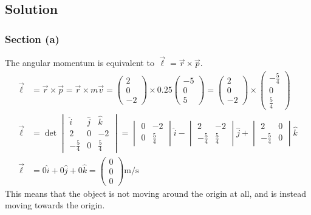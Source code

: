 \documentclass[12pt]{article}
\begin{document}
\subsection{Solution}
\subsubsection{Section (a)}
The angular momentum is equivalent to \(\vec{\ell} = \vec{r}\times\vec{p}\).
\begin{align}
    \vec{\ell}  &=  \vec{r} \times \vec{p}
        =   \vec{r} \times m\vec{v}
        =   \begin{pmatrix}2\\0\\-2\end{pmatrix} \times 0.25\begin{pmatrix}-5\\0\\5\end{pmatrix}
        =   \begin{pmatrix}2\\0\\-2\end{pmatrix} \times \begin{pmatrix}-\frac{5}{4}\\0\\\frac{5}{4}\end{pmatrix}\\
    \vec{\ell}  &=  \det\begin{vmatrix}
                            \hat{i} &\hat{j}&\hat{k}\\
                            2       &0      &-2     \\
                            -\frac{5}{4}&0  &\frac{5}{4}
                        \end{vmatrix}
        =   \begin{vmatrix}0&-2\\0&\frac{5}{4}\end{vmatrix}\hat{i} -
            \begin{vmatrix}2&-2\\-\frac{5}{4}&\frac{5}{4}\end{vmatrix}\hat{j} + 
            \begin{vmatrix}2&0\\-\frac{5}{4}&0\end{vmatrix}\hat{k}\\
    \vec{\ell}  &=  0\hat{i} + 0\hat{j} + 0\hat{k} 
        = \boxed{\begin{pmatrix}0\\0\\0\end{pmatrix}\unit{\meter/\second}}
\end{align}
This means that the object is not moving around the origin at all, and is instead moving towards the origin. 
\end{document}
